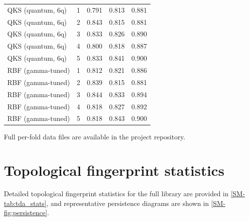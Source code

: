 \documentclass[11pt,a4paper]{article}
\begin{document}
\begin{table}[htbp]
\begin{tabularx}{\textwidth}{l l S[table-format=1.3] S[table-format=1.3] S[table-format=1.3]}
\midrule
QKS (quantum, 6q) & 1 & 0.791 & 0.813 & 0.881 \\
QKS (quantum, 6q) & 2 & 0.843 & 0.815 & 0.881 \\
QKS (quantum, 6q) & 3 & 0.833 & 0.826 & 0.890 \\
QKS (quantum, 6q) & 4 & 0.800 & 0.818 & 0.887 \\
QKS (quantum, 6q) & 5 & 0.833 & 0.841 & 0.900 \\
\midrule
RBF (gamma-tuned) & 1 & 0.812 & 0.821 & 0.886 \\
RBF (gamma-tuned) & 2 & 0.839 & 0.815 & 0.881 \\
RBF (gamma-tuned) & 3 & 0.844 & 0.833 & 0.894 \\
RBF (gamma-tuned) & 4 & 0.818 & 0.827 & 0.892 \\
RBF (gamma-tuned) & 5 & 0.818 & 0.843 & 0.900 \\
\bottomrule
\end{tabularx}
\end{table}

Full per-fold data files are available in the project repository.

\section{Topological fingerprint statistics}



Detailed topological fingerprint statistics for the full library are provided in \cref{SM-tab:tda_stats}, and representative persistence diagrams are shown in \cref{SM-fig:persistence}.
\end{document}
